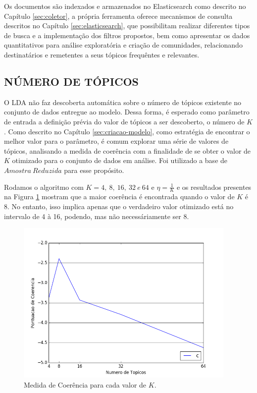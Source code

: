 \documentclass[12pt,a4paper]{article}
\begin{document}
Os documentos são indexados e armazenados no Elasticsearch como descrito no Capítulo \ref{sec:coletor}, a própria ferramenta oferece mecanismos de consulta descritos no Capítulo \ref{sec:elasticsearch}, que possibilitam realizar diferentes tipos de busca e a implementação dos filtros propostos, bem como apresentar os dados quantitativos para análise exploratória e criação de comunidades, relacionando destinatários e remetentes a seus tópicos frequêntes e relevantes.

\subsection{NÚMERO DE TÓPICOS} \label{sec:n-topicos}

O LDA não faz descoberta automática  sobre o número de tópicos existente no conjunto de dados entregue ao modelo. Dessa forma,
 é esperado como parâmetro de entrada a definição prévia do valor de tópicos a ser descoberto, o número de $K$. Como descrito no Capítulo \ref{sec:criacao-modelo}, como estratégia de encontrar o melhor valor para o parâmetro, é comum explorar uma série de valores de tópicos, analisando  a medida de coerência com a finalidade de se obter o valor de $K$ otimizado para o conjunto de dados em análise. Foi utilizado a 
 base de $Amostra\ Reduzida$ para esse propósito.

Rodamos o algoritmo com $K=4,\ 8,\ 16,\ 32\ e\ 64$ e $\eta=\frac{1}{K}$ e os resultados presentes na Figura \ref{fig-cm-4-to-64}
 mostram que a maior coerência é encontrada quando o valor de $K$ é 8. No entanto, isso implica apenas que o verdadeiro 
 valor otimizado está no intervalo de 4 à 16, podendo, mas não necessáriamente ser 8.

\begin{figure}[H]
	\centering
    \includegraphics[height=8cm]{images/figure_5.png}
    \caption{Medida de Coerência para cada valor de $K$.}
    \label{fig-cm-4-to-64}
\end{figure}
\end{document}
